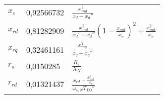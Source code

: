 \begin{longtable}[]{@{}lll@{}}
\begin{minipage}[t]{0.13\columnwidth}\raggedright
\(x_e\)\strut
\end{minipage} & \begin{minipage}[t]{0.09\columnwidth}\raggedright
0,92566732\strut
\end{minipage} & \begin{minipage}[t]{0.69\columnwidth}\raggedright
\(\frac{x_{md}^2}{x_d-x_d''}\)\strut
\end{minipage}\tabularnewline
\begin{minipage}[t]{0.13\columnwidth}\raggedright
\(x_{rd}\)\strut
\end{minipage} & \begin{minipage}[t]{0.09\columnwidth}\raggedright
0,81282909\strut
\end{minipage} & \begin{minipage}[t]{0.69\columnwidth}\raggedright
\(\frac{x_{md}^2}{x_d'-x_d''}(1-\frac{x_{md}}{x_e})^2+\frac{x_{md}^2}{x_e}\)\strut
\end{minipage}\tabularnewline
\begin{minipage}[t]{0.13\columnwidth}\raggedright
\(x_{rq}\)\strut
\end{minipage} & \begin{minipage}[t]{0.09\columnwidth}\raggedright
0,32461161\strut
\end{minipage} & \begin{minipage}[t]{0.69\columnwidth}\raggedright
\(\frac{x_{mq}^2}{x_q-x_q''}\)\strut
\end{minipage}\tabularnewline
\begin{minipage}[t]{0.13\columnwidth}\raggedright
\(r_s\)\strut
\end{minipage} & \begin{minipage}[t]{0.09\columnwidth}\raggedright
0,0150285\strut
\end{minipage} & \begin{minipage}[t]{0.69\columnwidth}\raggedright
\(\frac{R_s}{X_N}\)\strut
\end{minipage}\tabularnewline
\begin{minipage}[t]{0.13\columnwidth}\raggedright
\(r_{rd}\)\strut
\end{minipage} & \begin{minipage}[t]{0.09\columnwidth}\raggedright
0,01321437\strut
\end{minipage} & \begin{minipage}[t]{0.69\columnwidth}\raggedright
\(\frac{x_{rd}-\frac{x_{md}^2}{x_e}}{\omega_{s,N}T_{D0}''}\)\strut

\end{minipage}
\end{longtable}
